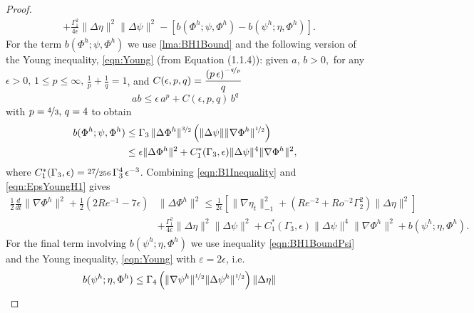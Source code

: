 \begin{proof}
\begin{equation}
\begin{split}
     & + \frac{\Gamma_1^2}{4 \epsilon}\|\Delta \eta\|^2 \|\Delta \psi\|^2  -
     \left[b(\Phi^h;\psi,\Phi^h) - b(\psi^h;\eta,\Phi^h)\right].
    \end{split}
    \label{eqn:B1Inequality}
  \end{equation}
  For the term $b(\Phi^h; \psi, \Phi^h)$ we use \autoref{lma:BH1Bound} and the
  following version of the Young inequality, \eqref{eqn:Young} (from \cite{Layton08} Equation (1.1.4)):
  given $a,\,b>0,$ for any $\epsilon > 0,\, 1\le p \le \infty,\, \frac{1}{p} +
  \frac{1}{q} = 1$, and
  $C(\epsilon,p,q)=\dfrac{\left(p\,\epsilon\right)^{-\nicefrac{q}{p}}}{q}$
  \begin{equation*}
    ab \le \epsilon\, a^p + C(\epsilon,p,q)\, b^q
  \end{equation*}
  with $p=\nicefrac{4}{3},\, q = 4$ to obtain
  \begin{align}
    b(\Phi^h; \psi, \Phi^h) &\le \Gamma_3\, \|\Delta \Phi^h\|^{\nicefrac{3}{2}}
      \left(\|\Delta \psi\| \|\nabla \Phi^h\|^{\nicefrac{1}{2}}\right)
      \nonumber \\
    &\le \epsilon \|\Delta \Phi^h\|^2 + C^*_1(\Gamma_3,\epsilon) \|\Delta \psi\|^4
      \|\nabla \Phi^h\|^2,
    \label{eqn:EpsYoungH1}
  \end{align}
  where $C^*_1(\Gamma_3,\epsilon) = \nicefrac{27}{256}\,\Gamma_3^4\,\epsilon^{-3}$.
  Combining \eqref{eqn:B1Inequality} and \eqref{eqn:EpsYoungH1} gives
  \begin{equation}
    \begin{split}
      \frac{1}{2} \frac{d}{dt} \|\nabla \Phi^h\|^2 + \frac{1}{2}\left(2Re^{-1} -
        7 \epsilon \right)
        &\|\Delta \Phi^h\|^2 \le \frac{1}{2 \epsilon}\left[\|\nabla \eta_t\|_{-1}^2
        + \left( Re^{-2} + Ro^{-2} \Gamma_2^2 \right) \|\Delta \eta\|^2\right] \\
      & + \frac{\Gamma_1^2}{4\epsilon}\|\Delta \eta\|^2 \|\Delta \psi\|^2
        + C^*_1(\Gamma_3,\epsilon) \|\Delta \psi\|^4 \|\nabla \Phi^h\|^2
        + b(\psi^h;\eta,\Phi^h).
    \end{split}
    \label{eqn:B2Inequality}
  \end{equation}
  For the final term involving $b(\psi^h; \eta, \Phi^h)$ we use inequality
  \eqref{eqn:BH1BoundPsi} and the Young inequality, \eqref{eqn:Young} with
  $\varepsilon = 2 \epsilon$, i.e.
  \begin{align}
    b(\psi^h; \eta, \Phi^h) &\le \Gamma_4\left(\|\nabla \psi^h\|^{\nicefrac{1}{2}}
      \|\Delta \psi^h\|^{\nicefrac{1}{2}}\right) \|\Delta \eta\|\,

\end{align}
\end{proof}
